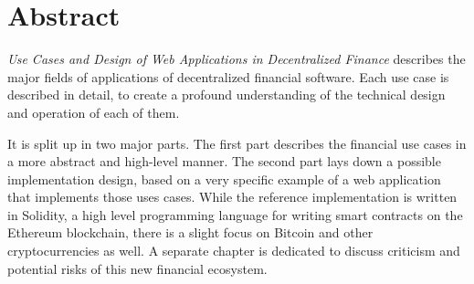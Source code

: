 \chapter{Abstract}

\textit{Use Cases and Design of Web Applications in Decentralized Finance} describes the major fields of applications of decentralized financial
software. Each use case is described in detail, to create a profound understanding of the technical design and operation of each of them.

It is split up in two major parts. The first part describes the financial use cases in a more abstract and high-level manner. The second part lays
down a possible implementation design, based on a very specific example of a web application that implements those uses cases. While the reference
implementation is written in Solidity, a high level programming language for writing smart contracts on the Ethereum blockchain, there is a slight
focus on Bitcoin and other cryptocurrencies as well. A separate chapter is dedicated to discuss criticism and potential risks of this new financial
ecosystem.